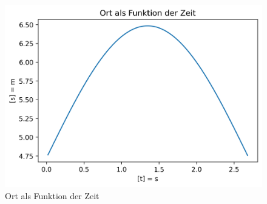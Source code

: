 \documentclass[../main.tex]{subfiles}
\begin{document}
    \begin{figure}[H]
        \begin{center}
            \centerline{\includegraphics[width=155mm]{./images/Elastisch/OrtAlsFunktionDerZeit}}
            \caption{Ort als Funktion der Zeit}
            \label{fig:OrtAlsFunktionDerZeit}
        \end{center}
    \end{figure}

    \newpage
\end{document}
